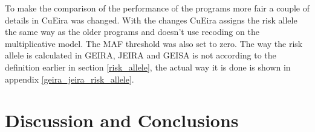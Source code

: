 \documentclass[10pt,a4paper]{report}
\begin{document}

To make the comparison of the performance of the programs more fair a couple of details in CuEira was changed. With the changes CuEira assigns the risk allele the same way as the older programs and doesn't use recoding on the multiplicative model. The MAF threshold was also set to zero. The way the risk allele is calculated in GEIRA, JEIRA and GEISA is not according to the definition earlier in section \ref{risk_allele}, the actual way it is done is shown in appendix \ref{geira_jeira_risk_allele}.






\chapter{Discussion and Conclusions}







\end{document}
